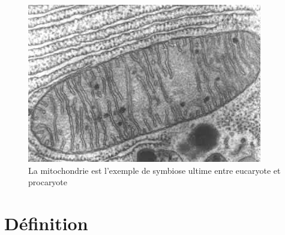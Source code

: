 \documentclass[12pt,a4paper]{article}
\begin{document}
\begin{figure}[ht]
\begin{center}
\includegraphics[scale=0.5]{img/mitochondrie.jpg}\hfill
\end{center}
\caption{La mitochondrie est l'exemple de symbiose ultime entre eucaryote et procaryote}
\label{bach}
\end{figure}



\newpage

\section{Définition}
\end{document}
